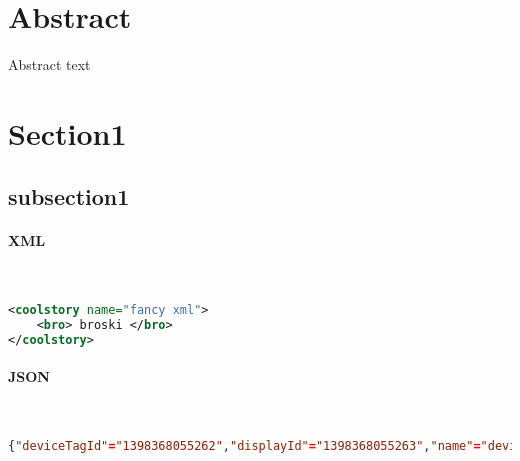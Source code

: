 \documentclass[
10pt, %
letterpaper, %
oneside, %
headinclude,footinclude, %
BCOR5mm, %
]{scrartcl}
\title{\normalfont\spacedallcaps{Documentation Template}} %
\author{\spacedlowsmallcaps{Michael Meding* , mmeding@outsmartinc.com}} %
\date{} %
\begin{document}
\maketitle %

\setcounter{tocdepth}{2} %

\tableofcontents %

\thispagestyle{empty} %

 
\section*{Abstract}
Abstract text
 


\section{Section1}


\subsection{subsection1}


\paragraph{XML}~
\begin{lstlisting}[language=XML]
<coolstory name="fancy xml">
	<bro> broski </bro>
</coolstory>
\end{lstlisting}

\paragraph{JSON}~
\begin{lstlisting}[language=json]
{"deviceTagId"="1398368055262","displayId"="1398368055263","name"="device_tags","locationId"="750","deviceTag" "id"="1398368055263"}
\end{lstlisting}
\end{document}
